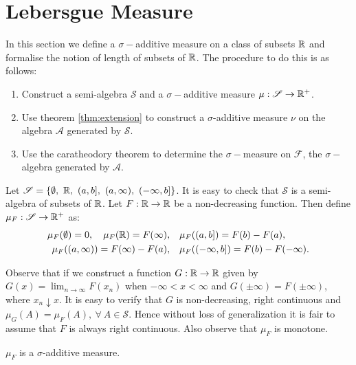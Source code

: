 \section{Lebersgue Measure}
In this section we define a $\sigma-$additive measure on a class of subsets $\mathbb{R}$ and formalise the notion of length of subsets of $\mathbb{R}$. The procedure to do this is as follows:
\begin{enumerate}
  \item Construct a semi-algebra $ \mathscr{S}$ and a $\sigma-$additive measure $\mu: \mathscr{S}\to \mathbb{R}^+$.
  \item Use theorem \cref{thm:extension} to construct a $\sigma$-additive measure $\nu$ on the algebra $ \mathscr{A}$ generated by $ \mathscr{S}$.
  \item Use the caratheodory theorem to determine the $\sigma-$measure on $ \mathscr{F}$, the $\sigma-$algebra generated by $ \mathscr{A}$.
\end{enumerate}
\begin{definition}  
Let $ \mathscr{S} = \{ \emptyset,\ \R,\ (a,b],\ (a,\infty),\ (-\infty, b]\}$. It is easy to check that $ \mathscr{S}$ is a semi-algebra of subsets of $\mathbb{R}$. Let $F:\mathbb{R}\to\mathbb{R}$ be a non-decreasing function. Then define $\mu_F: \mathscr{S}\to \mathbb{R}^+$ as:
\begin{align*}
  \mu_F(\emptyset) = 0,\quad \mu_F(\mathbb{R})=F(\infty),\quad &\mu_F((a,b]) = F(b)-F(a), \\ \mu_F((a,\infty))=F(\infty) - F(a),\quad &\mu_F((-\infty,b]) = F(b)- F(-\infty).
\end{align*}
\end{definition}
\begin{remark}
  Observe that if we construct a function $G:\mathbb{R}\to\mathbb{R}$ given by $G(x) = \lim_{n\to\infty} F(x_n)$ when $-\infty<x<\infty$ and $G(\pm \infty) = F(\pm \infty)$, where $x_n \downarrow x$. It is easy to verify that $G$ is non-decreasing, right continuous and $\mu_G(A) = \mu_F(A),\ \forall\ A \in \mathscr{S}$. Hence without loss of generalization it is fair to assume that $F$ is always right continuous. Also observe that $\mu_F$ is monotone. 
\end{remark}
\begin{proposition}
  $\mu_F$ is a $\sigma$-additive measure. 
\end{proposition}
